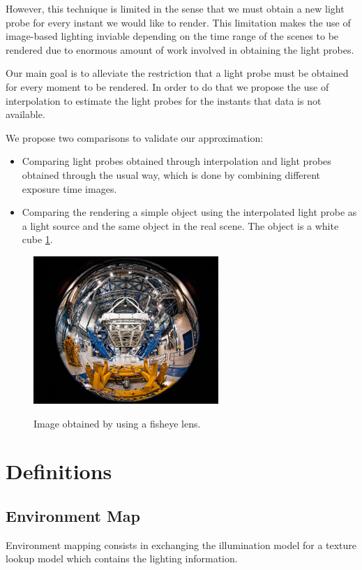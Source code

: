 \documentclass[conference]{acmsiggraph}
\begin{document}
However, this technique is limited in the sense that we must obtain a new light probe for every instant we would like to render. This limitation makes the use of image-based lighting 
inviable depending on the time range of the scenes to be rendered due to enormous amount of work involved in obtaining the light probes.

Our main goal is to alleviate the restriction that a light probe must be obtained for every moment to be rendered. In order to do that we propose the use of interpolation to estimate 
the light probes for the instants that data is not available.

We propose two comparisons to validate our approximation:
\begin{itemize}
	\item Comparing light probes obtained through interpolation and light probes obtained through the usual way, which is done by combining different exposure time images.
	\item Comparing the rendering a simple object using the interpolated light probe as a light source and the same object in the real scene. The object is a white cube \ref{fig:whitecube}.
\end{itemize}

\begin{figure}[!ht]
	\caption{Image obtained by using a fisheye lens.}
	\centering
	\includegraphics[width=7cm]{images/fisheye.jpg}
	\label{fig:whitecube}
\end{figure}

\section{Definitions}

\subsection{Environment Map}

	Environment mapping \cite{hughes2013} consists in exchanging the illumination model for a texture lookup model which contains the lighting information.
\end{document}
